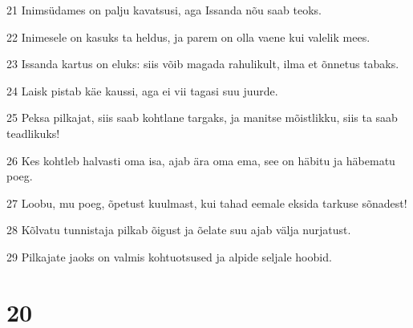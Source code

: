 \par 21 Inimsüdames on palju kavatsusi, aga Issanda nõu saab teoks.
\par 22 Inimesele on kasuks ta heldus, ja parem on olla vaene kui valelik mees.
\par 23 Issanda kartus on eluks: siis võib magada rahulikult, ilma et õnnetus tabaks.
\par 24 Laisk pistab käe kaussi, aga ei vii tagasi suu juurde.
\par 25 Peksa pilkajat, siis saab kohtlane targaks, ja manitse mõistlikku, siis ta saab teadlikuks!
\par 26 Kes kohtleb halvasti oma isa, ajab ära oma ema, see on häbitu ja häbematu poeg.
\par 27 Loobu, mu poeg, õpetust kuulmast, kui tahad eemale eksida tarkuse sõnadest!
\par 28 Kõlvatu tunnistaja pilkab õigust ja õelate suu ajab välja nurjatust.
\par 29 Pilkajate jaoks on valmis kohtuotsused ja alpide seljale hoobid.

\chapter{20}


